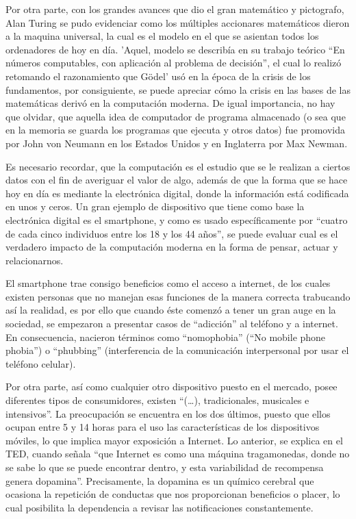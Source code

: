\documentclass[letterpaper, 12 pt, conference]{ieeeconf}  %
\begin{document}
\begin{.}
Por otra parte, con los grandes avances que dio el gran matemático y pictografo, Alan Turing se pudo evidenciar como los múltiples accionares matemáticos dieron a la maquina universal, la cual es el modelo en el que se asientan todos los ordenadores de hoy en día. 'Aquel, modelo se describía en su trabajo teórico “En números computables, con aplicación al problema de decisión”, el cual lo realizó retomando el razonamiento que Gödel'\cite{c7} usó en la época de la crisis de los fundamentos, por consiguiente, se puede apreciar cómo la crisis en las bases de las matemáticas derivó en la computación moderna. De igual importancia, no hay que olvidar, que aquella idea de computador de programa almacenado (o sea que en la memoria se guarda los programas que ejecuta y otros datos) fue promovida por John von Neumann en los Estados Unidos y en Inglaterra por Max Newman. 

Es necesario recordar, que la computación es el estudio que se le realizan a ciertos datos con el fin de averiguar el valor de algo, además de que la forma que se hace hoy en día es mediante la electrónica digital, donde la información está codificada en unos y ceros. Un gran ejemplo de dispositivo que tiene como base la electrónica digital es el smartphone, y como es usado específicamente por “cuatro de cada cinco individuos entre los 18 y los 44 años”\cite{c5}, se puede evaluar cual es el verdadero impacto de la computación moderna en la forma de pensar, actuar y relacionarnos. 

El smartphone trae consigo beneficios como el acceso a internet, de los cuales existen personas que no manejan esas funciones de la manera correcta trabucando así la realidad, es por ello que cuando éste comenzó a tener un gran auge en la sociedad, se empezaron a presentar casos de “adicción” al teléfono y a internet. En consecuencia, nacieron términos como “nomophobia” (“No mobile phone phobia”) o “phubbing” (interferencia de la comunicación interpersonal por usar el teléfono celular)\cite{c13}. 

Por otra parte, así como cualquier otro dispositivo puesto en el mercado, posee diferentes tipos de consumidores, existen “(…), tradicionales, musicales e intensivos”\cite{c14}. La preocupación se encuentra en los dos últimos, puesto que ellos ocupan entre 5 y 14 horas para el uso las características de los dispositivos móviles, lo que implica mayor exposición a Internet. Lo anterior, se explica en el TED, cuando señala “que Internet es como una máquina tragamonedas, donde no se sabe lo que se puede encontrar dentro, y esta variabilidad de recompensa genera dopamina”\cite{c15}. Precisamente, la dopamina es un químico cerebral que ocasiona la repetición de conductas que nos proporcionan beneficios o placer, lo cual posibilita la dependencia a revisar las notificaciones constantemente. 


\end{.}
\end{document}
